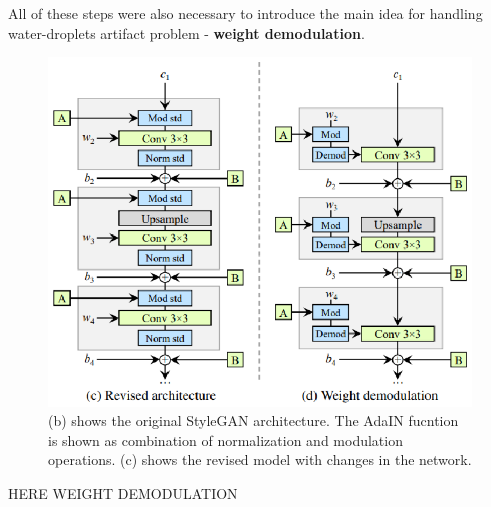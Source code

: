 \documentclass[12pt,a4paper,openany]{book}
\begin{document}
All of these steps were also necessary to introduce the main idea for handling water-droplets artifact problem - \textbf{weight demodulation}.

\begin{figure}[ht!]
    \centering
    \includegraphics[scale=1.3]{figs/weight-demodulation.eps}
    \caption{(b) shows the original StyleGAN architecture. The AdaIN fucntion is shown as combination of normalization and modulation operations. (c) shows the revised model with changes in the network.}\label{Fig:STYLEGAN}
\end{figure}

HERE WEIGHT DEMODULATION





\end{document}
